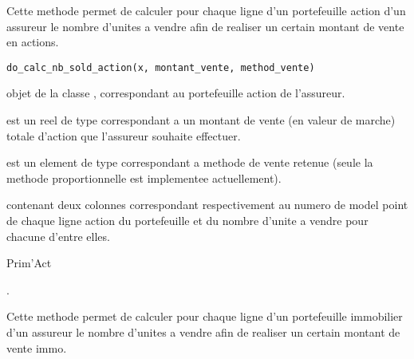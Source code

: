 \documentclass[a4paper]{book}
\begin{document}
%
\begin{Description}\relax
Cette methode permet de calculer pour chaque ligne d'un portefeuille
action d'un assureur le nombre d'unites a vendre afin de realiser un certain montant de vente en actions.
\end{Description}
%
\begin{Usage}
\begin{verbatim}
do_calc_nb_sold_action(x, montant_vente, method_vente)
\end{verbatim}
\end{Usage}
%
\begin{Arguments}
\begin{ldescription}
\item[\code{x}] objet de la classe , correspondant au portefeuille action de l'assureur.

\item[\code{montant\_vente}] est un reel de type  correspondant a un montant de vente (en valeur de marche) totale d'action que l'assureur souhaite effectuer.

\item[\code{method\_vente}] est un element de type  correspondant a methode de vente
retenue (seule la methode proportionnelle est implementee actuellement).
\end{ldescription}
\end{Arguments}
%
\begin{Value}
 contenant deux colonnes  correspondant
respectivement au numero de model point de chaque ligne action du portefeuille
et du nombre d'unite a vendre pour chacune d'entre elles.
\end{Value}
%
\begin{Author}\relax
Prim'Act
\end{Author}
%
\begin{SeeAlso}\relax
{}.
\end{SeeAlso}
%
\begin{Description}\relax
Cette methode permet de calculer pour chaque ligne d'un portefeuille
immobilier d'un assureur le nombre d'unites a vendre afin de realiser un certain montant de vente immo.
\end{Description}
\end{document}
